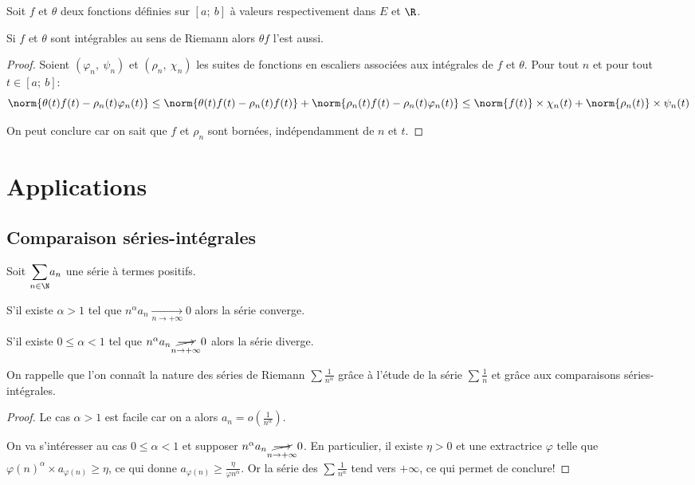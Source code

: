 \begin{prop}
Soit $f$ et $\theta$ deux fonctions définies sur $[a;~b]$ à valeurs respectivement dans $E$ et $\R$.

Si $f$ et $\theta$ sont intégrables au sens de Riemann alors $\theta f$ l'est aussi.
\end{prop}

\begin{proof}
Soient $\left(\varphi_n,~\psi_n\right)$ et $\left(\rho_n,~\chi_n\right)$ les suites de fonctions en escaliers associées aux intégrales de $f$ et $\theta$. Pour tout $n$ et pour tout $t \in [a;~b]$:
\[
\norm{\theta(t)f(t)-\rho_n(t)\varphi_n(t)} \leq \norm{\theta(t)f(t)-\rho_n(t)f(t)}+ \norm{\rho_n(t)f(t)-\rho_n(t)\varphi_n(t)} \leq \norm{f(t)} \times \chi_n(t) + \norm{\rho_n(t)} \times \psi_n(t)
\]

On peut conclure car on sait que $f$ et $\rho_n$ sont bornées, indépendamment de $n$ et $t$.
\end{proof}

\section{Applications}

\subsection{Comparaison séries-intégrales}

\begin{lem}
Soit $\displaystyle{\sum \limits_{n \in \N}} a_n$ une série à termes positifs.

S'il existe $\alpha>1$ tel que $n^{\alpha}a_n \underset{n \to +\infty}{\longrightarrow} 0$ alors la série converge.

S'il existe $0 \leq \alpha < 1$ tel que $n^{\alpha}a_n \underset{n \to +\infty}{\cancel{\longrightarrow}} 0$ alors la série diverge.
\end{lem}

On rappelle que l'on connaît la nature des séries de Riemann $\sum \frac{1}{n^\alpha}$ grâce à l'étude de la série $\sum \frac{1}{n}$ et grâce aux comparaisons séries-intégrales.

\begin{proof}
Le cas $\alpha>1$ est facile car on a alors $a_n = o\left ( \frac{1}{n^{\alpha}}\right )$.

On va s'intéresser au cas $0 \leq \alpha < 1$ et supposer $n^{\alpha}a_n \underset{n \to +\infty}{\cancel{\longrightarrow}} 0$. En particulier, il existe $\eta>0$ et une extractrice $\varphi$ telle que $\varphi(n)^{\alpha} \times a_{\varphi(n)} \geq \eta$, ce qui donne $a_{\varphi(n)} \geq \frac{\eta}{\varphi{n}^{\alpha}}$. Or la série des $\sum \frac{1}{n^{\alpha}}$ tend vers $+\infty$, ce qui permet de conclure!
\end{proof}


